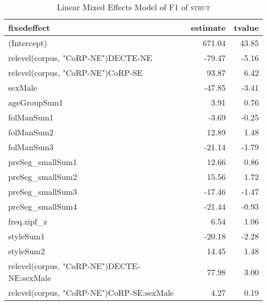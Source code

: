 \begin{table}[ht]
\centering
\begin{tabular}{lrr}
  \hline
fixedeffect & estimate & tvalue \\ 
  \hline
(Intercept) & 671.04 & 43.85 \\ 
  relevel(corpus, "CoRP-NE")DECTE-NE & -79.47 & -5.16 \\ 
  relevel(corpus, "CoRP-NE")CoRP-SE & 93.87 & 6.42 \\ 
  sexMale & -47.85 & -3.41 \\ 
  ageGroupSum1 & 3.91 & 0.76 \\ 
  folManSum1 & -3.69 & -0.25 \\ 
  folManSum2 & 12.89 & 1.48 \\ 
  folManSum3 & -21.14 & -1.79 \\ 
  preSeg\_smallSum1 & 12.66 & 0.86 \\ 
  preSeg\_smallSum2 & 15.56 & 1.72 \\ 
  preSeg\_smallSum3 & -17.46 & -1.47 \\ 
  preSeg\_smallSum4 & -21.44 & -0.93 \\ 
  freq.zipf\_z & 6.54 & 1.06 \\ 
  styleSum1 & -20.18 & -2.28 \\ 
  styleSum2 & 14.45 & 1.48 \\ 
  relevel(corpus, "CoRP-NE")DECTE-NE:sexMale & 77.98 & 3.00 \\ 
  relevel(corpus, "CoRP-NE")CoRP-SE:sexMale & 4.27 & 0.19 \\ 
   \hline
\end{tabular}
\caption{Linear Mixed Effects Model of F1 of \textsc{strut} \label{tbl:strutF1}} 
\end{table}

